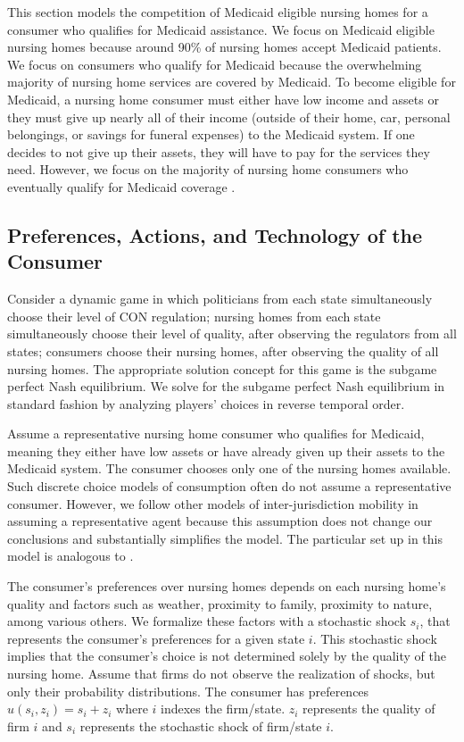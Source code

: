 \documentclass[../Main.tex]{subfiles}
\begin{document}
This section models the competition of Medicaid eligible nursing homes for a consumer who qualifies for Medicaid assistance. We focus on Medicaid eligible nursing homes because around 90\% of nursing homes accept Medicaid patients. We focus on consumers who qualify for Medicaid because the overwhelming majority of nursing home services are covered by Medicaid. To become eligible for Medicaid, a nursing home consumer must either have low income and assets or they must give up nearly all of their income (outside of their home, car, personal belongings, or savings for funeral expenses) to the Medicaid system. If one decides to not give up their assets, they will have to pay for the services they need. However, we focus on the majority of nursing home consumers who eventually qualify for Medicaid coverage .  

\subsection{Preferences, Actions, and Technology of the Consumer}
Consider a dynamic game in which politicians from each state simultaneously choose their level of CON regulation; nursing homes from each state simultaneously choose their level of quality, after observing the regulators from all states; consumers choose their nursing homes, after observing the quality of all nursing homes. The appropriate solution concept for this game is the subgame perfect Nash equilibrium. We solve for the subgame perfect Nash equilibrium in standard fashion by analyzing players' choices in reverse temporal order. 

Assume a representative nursing home consumer who qualifies for Medicaid, meaning they either have low assets or have already given up their assets to the Medicaid system. The consumer chooses only one of the nursing homes available. Such discrete choice models of consumption often do not assume a representative consumer. However, we follow other models of inter-jurisdiction mobility in assuming a representative agent because this assumption does not change our conclusions and substantially simplifies the model. The particular set up in this model is analogous to \citet{basinger2004remodeling}.

The consumer's preferences over nursing homes depends on each nursing home's quality and factors such as weather, proximity to family, proximity to nature, among various others. We formalize these factors with a stochastic shock $s_i$, that represents the consumer's preferences for a given state $i$. This stochastic shock implies that the consumer's choice is not determined solely by the quality of the nursing home. Assume that firms do not observe the realization of shocks, but only their probability distributions. The consumer has preferences $u(s_i,z_i) = s_i + z_i$ where $i$ indexes the firm/state. $z_i$ represents the quality of firm $i$ and $s_i$ represents the stochastic shock of firm/state $i$. 
\end{document}
